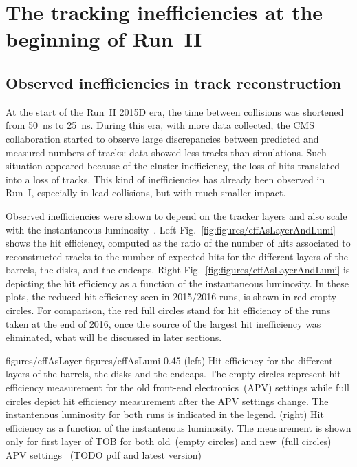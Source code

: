 
\section{The tracking inefficiencies at the beginning of Run~II}

\subsection{Observed inefficiencies in track reconstruction}

At the start of the Run~II 2015D era, the time between collisions was shortened from 50~ns to 25~ns. During this era, with more data collected, the CMS collaboration started to observe large discrepancies between predicted and measured numbers of tracks: data showed less tracks than simulations. Such situation appeared because of the cluster inefficiency, the loss of hits translated into a loss of tracks. This kind of inefficiencies has already been observed in Run~I, especially in lead collisions, but with much smaller impact. 

Observed inefficiencies were shown to depend on the tracker layers and also scale with the instantaneous luminosity~\cite{website:hitEff}. Left Fig.~\ref{fig:figures/effAsLayerAndLumi} shows the hit efficiency, computed as the ratio of the number of hits associated to reconstructed tracks to the number of expected hits for the different layers of the barrels, the disks, and the endcaps. Right Fig.~\ref{fig:figures/effAsLayerAndLumi} is depicting the hit efficiency  as a function of the instantaneous luminosity. In these plots, the reduced hit efficiency seen in 2015/2016 runs, is shown in red empty circles. For comparison, the red full circles stand for hit efficiency of the runs taken at the end of 2016, once the source of the largest hit inefficiency was eliminated, what will be discussed in later sections.


                 {figures/effAsLayer}
                 {figures/effAsLumi} %
                 {0.45}       %
                 {(left) Hit efficiency for the different layers of the barrels, the disks and the endcaps. The empty circles represent hit efficiency measurement for the old front-end electronics~(APV) settings while full circles depict hit efficiency measurement after the APV settings change. The instantenous luminosity for both runs is indicated in the legend. (right) Hit efficiency as a function of the instantenous luminosity. The measurement is shown only for first layer of TOB for both old~(empty circles) and new~(full circles) APV settings~\cite{website:hitEff} (TODO pdf and latest version) } %


